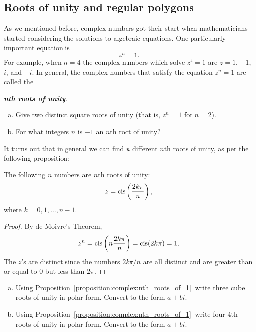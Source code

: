\subsection{Roots of unity and regular polygons}\label {sec:RootsOfUnity}
As we mentioned before, complex numbers got their start when mathematicians started considering the solutions to algebraic  equations. One particularly important equation is
\[z^{n}=1.\]
For example, when $n=4$ the complex numbers which solve $z^4=1$ are $z=1$, $-1$, $i$, and $-i$. In general, the complex numbers that satisfy the
equation $z^{n}=1$ are called the {\textbf{\emph{ nth roots of unity}}.

\begin{exercise}\label{exercise:complex:48}
\begin{enumerate}[(a)]
\item
Give two distinct square roots of unity (that is, $z^n = 1$ for $n=2$).
\item
For what integers $n$ is $-1$ an $n$th root of unity?
\end{enumerate}
\end{exercise}

It turns out that in general we can find $n$ different $n$th roots of unity, as per the following proposition:

\begin{prop}\label{proposition:complex:nth_roots_of_1} The following $n$ numbers are $n$th roots of unity:
\[
z=\operatorname{cis}\left(\frac{2k\pi}{n}\right),\]
 where $k=0,1,\ldots,n-1$. \end{prop}

\begin{proof} By de Moivre's Theorem, \[
z^{n}=\operatorname{cis}\left(n\frac{2k\pi}{n}\right)=\operatorname{cis}(2k\pi)=1.\]
 The $z$'s are distinct since the numbers $2k\pi/n$ are all distinct 
and are greater than or equal to 0 but less than $2\pi$. 
\end{proof}

\begin{exercise}\label{exercise:complex:49}
\begin{enumerate}[(a)]
\item
Using Proposition~\ref{proposition:complex:nth_roots_of_1}, write three cube roots of unity in polar form. Convert to the form $a + bi$.
\item
Using Proposition~\ref{proposition:complex:nth_roots_of_1}, write four 4th roots of unity in polar form. Convert to the form $a+bi$.
\end{enumerate}
\end{exercise}

}
